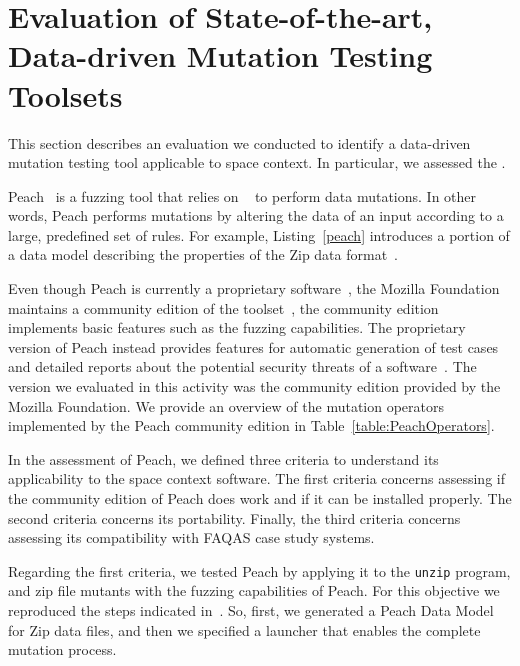 \clearpage
\section{Evaluation of State-of-the-art, Data-driven Mutation Testing Toolsets}
\label{sec:toolsComparisonDataDriven}

This section describes an evaluation we conducted to identify a data-driven mutation testing tool applicable to space context. In particular, we assessed the .






Peach~\cite{PeachMozilla,PeachFuzzer} is a fuzzing tool that relies on ~\cite{pham2016model,spike} to perform data mutations. In other words, Peach performs mutations by altering the data of an input according to a large, predefined set of rules. For example, Listing~\ref{peach} introduces a portion of a data model describing the properties of the Zip data format~\cite{zipformat}. 

Even though Peach is currently a proprietary software~\cite{PeachFuzzer}, the Mozilla Foundation maintains a community edition of the toolset~\cite{PeachMozilla}, the community edition implements basic features such as the fuzzing capabilities. The proprietary version of Peach instead provides features for automatic generation of test cases and detailed reports about the potential security threats of a software~\cite{PeachFuzzer}. The version we evaluated in this activity was the community edition provided by the Mozilla Foundation. We provide an overview of the mutation operators implemented by the Peach community edition in Table~\ref{table:PeachOperators}.


In the assessment of Peach, we defined three criteria to understand its applicability to the space context software. The first criteria concerns assessing if the community edition of Peach does work and if it can be installed properly. The second criteria concerns its portability. Finally, the third criteria concerns assessing its compatibility with FAQAS case study systems.

Regarding the first criteria, we tested Peach by applying it to the \texttt{unzip} program, and zip file mutants with the fuzzing capabilities of Peach. For this objective we reproduced the steps indicated in~\cite{zipexample}. So, first, we generated a Peach Data Model for Zip data files, and then we specified a launcher that enables the complete mutation process.

